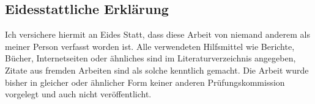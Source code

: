 \subsection*{Eidesstattliche Erklärung}

Ich versichere hiermit an Eides Statt, dass diese Arbeit von niemand anderem
als meiner Person verfasst worden ist. Alle verwendeten Hilfsmittel wie
Berichte, Bücher, Internetseiten oder ähnliches sind im Literaturverzeichnis
angegeben, Zitate aus fremden Arbeiten sind als solche kenntlich gemacht. Die
Arbeit wurde bisher in gleicher oder ähnlicher Form keiner anderen
Prüfungskommission vorgelegt und auch nicht veröffentlicht.\\

\thesisDate \\

\studentName
